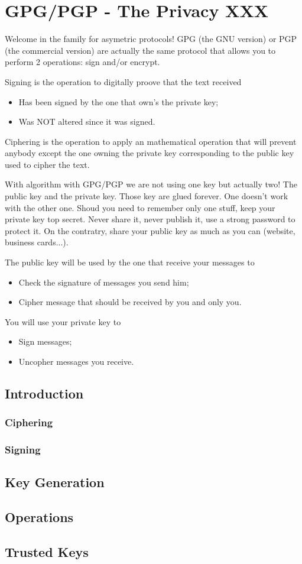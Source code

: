 \section{GPG/PGP - The Privacy XXX}

Welcome in the family for asymetric protocols!  GPG (the GNU version) or PGP (the commercial version) are actually the same protocol that allows you to perform 2 operations: sign and/or encrypt.

Signing is the operation to digitally proove that the text received
\begin{itemize}
    \item Has been signed by the one that own's the private key;
    \item Was NOT altered since it was signed.
\end{itemize}

Ciphering is the operation to apply an mathematical operation that will prevent anybody except the one owning the private key corresponding to the public key used to cipher the text.

With algorithm with GPG/PGP we are not using one key but actually two!  The public key and the private key.  Those key are glued forever.  One doesn't work with the other one.  Shoud you need to remember only one stuff, keep your private key top secret.  Never share it, never publish it, use a strong password to protect it.  On the contratry, share your public key as much as you can (website, business cards...).

The public key will be used by the one that receive your messages to
\begin{itemize}
    \item Check the signature of messages you send him;
    \item Cipher message that should be received by you and only you.
\end{itemize}

You will use your private key to
\begin{itemize}
    \item Sign messages;
    \item Uncopher messages you receive.
\end{itemize}


\subsection{Introduction}

\subsubsection{Ciphering}

\subsubsection{Signing}

\subsection{Key Generation}

\subsection{Operations}

\subsection{Trusted Keys}


